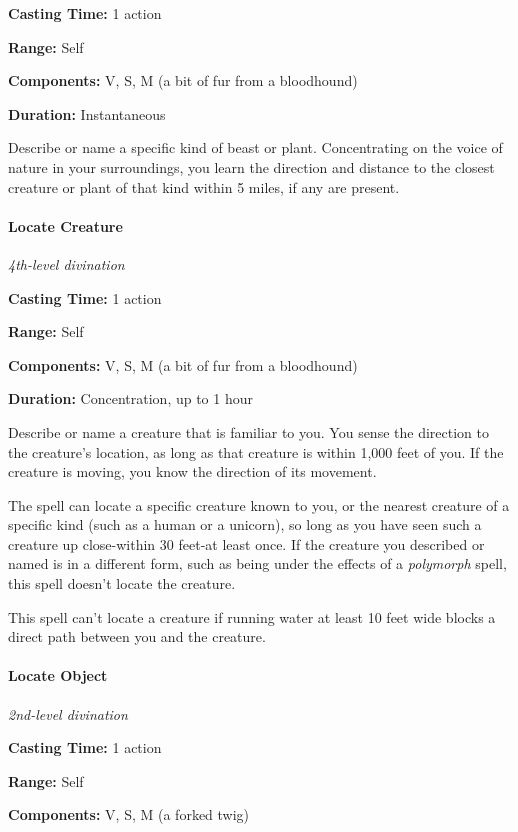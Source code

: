 \documentclass[
]{article}
\begin{document}
\textbf{Casting Time:} 1 action

\textbf{Range:} Self

\textbf{Components:} V, S, M (a bit of fur from a bloodhound)

\textbf{Duration:} Instantaneous

Describe or name a specific kind of beast or plant. Concentrating on the
voice of nature in your surroundings, you learn the direction and
distance to the closest creature or plant of that kind within 5 miles,
if any are present.

\hypertarget{locate-creature}{%
\paragraph{Locate Creature}\label{locate-creature}}

\emph{4th-level divination}

\textbf{Casting Time:} 1 action

\textbf{Range:} Self

\textbf{Components:} V, S, M (a bit of fur from a bloodhound)

\textbf{Duration:} Concentration, up to 1 hour

Describe or name a creature that is familiar to you. You sense the
direction to the creature's location, as long as that creature is within
1,000 feet of you. If the creature is moving, you know the direction of
its movement.

The spell can locate a specific creature known to you, or the nearest
creature of a specific kind (such as a human or a unicorn), so long as
you have seen such a creature up close-within 30 feet-at least once. If
the creature you described or named is in a different form, such as
being under the effects of a \emph{polymorph} spell, this spell doesn't
locate the creature.

This spell can't locate a creature if running water at least 10 feet
wide blocks a direct path between you and the creature.

\hypertarget{locate-object}{%
\paragraph{Locate Object}\label{locate-object}}

\emph{2nd-level divination}

\textbf{Casting Time:} 1 action

\textbf{Range:} Self

\textbf{Components:} V, S, M (a forked twig)
\end{document}
